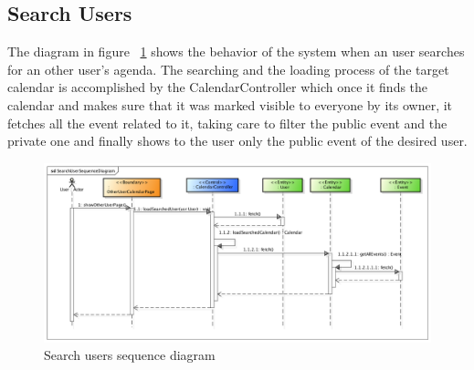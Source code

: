 \subsection{Search Users}
The diagram in figure ~\ref{fig:searchusSeq} shows the behavior of the system when an user searches for an other user's agenda. The searching and the loading process of the target calendar is accomplished by the CalendarController which once it finds the calendar and makes sure that it was marked visible to everyone by its owner, it fetches all the event related to it, taking care to filter the public event and the private one and finally shows to the user only the public event of the desired user.
 \begin{center}
 \begin{figure}[H]
    \includegraphics[width=1\textwidth]{../BCEDiagram/BCE/EntityOverview/SearchUserSequenceDiagram.png}
    \caption{Search users sequence diagram}
     \label{fig:searchusSeq}
     \end{figure}
   \end{center} 

